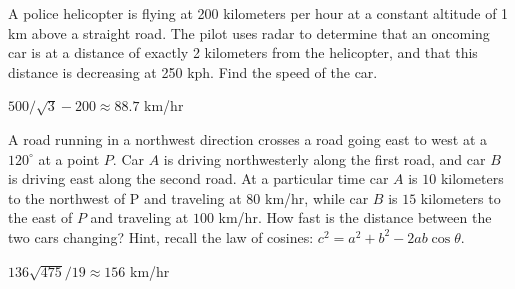 \begin{exercises}
\begin{exercise} A police helicopter is flying at 200 kilometers per hour at
a constant altitude of 1 km above a straight road.  The pilot uses
radar to determine that an oncoming car is at a distance of exactly 2
kilometers from the helicopter, and that this distance is decreasing at 250
kph.  Find the speed of the car.
\begin{answer} $500/\sqrt3-200\approx 88.7$ km/hr
\end{answer}\end{exercise}



\begin{exercise} 
A road running in a northwest direction crosses a road going east to
west at a $120^\circ$ at a point $P$. Car $A$ is driving northwesterly
along the first road, and car $B$ is driving east along the second
road. At a particular time car $A$ is $10$ kilometers to the northwest
of P and traveling at $80$ km/hr, while car $B$ is $15$ kilometers to
the east of $P$ and traveling at $100$ km/hr. How fast is the distance
between the two cars changing? Hint, recall the law of cosines:
$c^2=a^2+b^2-2ab\cos\theta$.
\begin{answer} $136\sqrt{475}/19\approx 156$ km/hr
\end{answer}\end{exercise}


\end{exercises}
